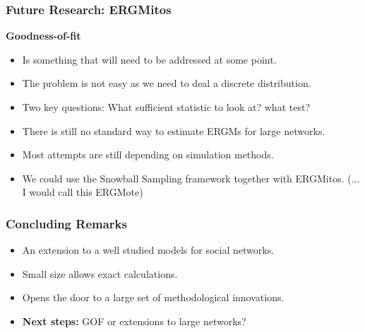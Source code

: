 \documentclass[aspectratio=169, 9pt]{beamer}\usepackage[]{graphicx}\usepackage[]{color}
\begin{document}
\begin{frame}[t]
\frametitle{Future Research: ERGMitos}

{\bf Goodness-of-fit}\pause
\begin{itemize}
\item Is something that will need to be addressed at some point.\pause
\item The problem is not easy as we need to deal a discrete distribution.\pause
\item Two key questions: What sufficient statistic to look at? what test?
\end{itemize}

 \pause
\begin{itemize}
\item There is still no standard way to estimate ERGMs for large networks.\pause
\item Most attempts are still depending on simulation methods.\pause
\item We could use the Snowball Sampling framework together with ERGMitos.\pause{}
(... I would call this ERGMote)
\end{itemize}

\end{frame}

\begin{frame}[t]
\frametitle{Concluding Remarks}

\begin{itemize}[<+->]
  \item An extension to a well studied models for social networks.
  \item Small size allows exact calculations.
  \item Opens the door to a large set of methodological innovations.
  \item \textbf{Next steps:} GOF or extensions to large networks?
\end{itemize}

\vfill
\footnotesize 
{}
\end{frame}
\end{document}
